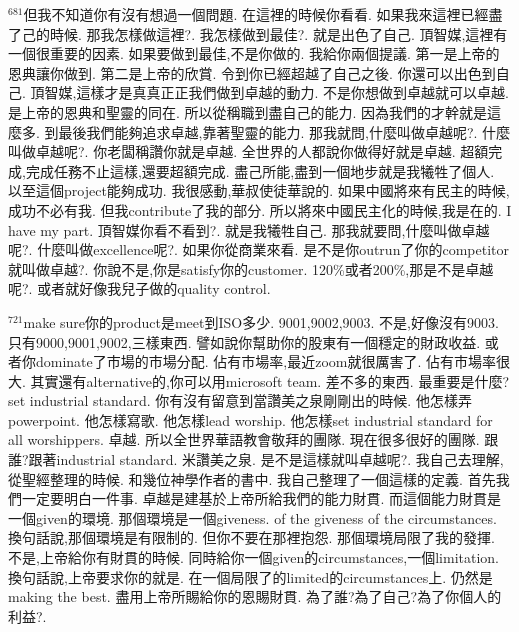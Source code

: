 \documentclass{book}
\begin{document}
$^{681}$但我不知道你有沒有想過一個問題.
在這裡的時候你看看.
如果我來這裡已經盡了己的時候.
那我怎樣做這裡?.
我怎樣做到最佳?.
就是出色了自己.
頂智媒,這裡有一個很重要的因素.
如果要做到最佳,不是你做的.
我給你兩個提議.
第一是上帝的恩典讓你做到.
第二是上帝的欣賞.
令到你已經超越了自己之後.
你還可以出色到自己.
頂智媒,這樣才是真真正正我們做到卓越的動力.
不是你想做到卓越就可以卓越.
是上帝的恩典和聖靈的同在.
所以從稱職到盡自己的能力.
因為我們的才幹就是這麼多.
到最後我們能夠追求卓越,靠著聖靈的能力.
那我就問,什麼叫做卓越呢?.
什麼叫做卓越呢?.
你老闆稱讚你就是卓越.
全世界的人都說你做得好就是卓越.
超額完成,完成任務不止這樣,還要超額完成.
盡己所能,盡到一個地步就是我犧牲了個人.
以至這個project能夠成功.
我很感動,華叔使徒華說的.
如果中國將來有民主的時候,成功不必有我.
但我contribute了我的部分.
所以將來中國民主化的時候,我是在的.
I have my part.
頂智媒你看不看到?.
就是我犧牲自己.
那我就要問,什麼叫做卓越呢?.
什麼叫做excellence呢?.
如果你從商業來看.
是不是你outrun了你的competitor就叫做卓越?.
你說不是,你是satisfy你的customer.
120\%或者200\%,那是不是卓越呢?.
或者就好像我兒子做的quality control.

$^{721}$make sure你的product是meet到ISO多少.
9001,9002,9003.
不是,好像沒有9003.
只有9000,9001,9002,三樣東西.
譬如說你幫助你的股東有一個穩定的財政收益.
或者你dominate了市場的市場分配.
佔有市場率,最近zoom就很厲害了.
佔有市場率很大.
其實還有alternative的,你可以用microsoft team.
差不多的東西.
最重要是什麼?set industrial standard.
你有沒有留意到當讚美之泉剛剛出的時候.
他怎樣弄powerpoint.
他怎樣寫歌.
他怎樣lead worship.
他怎樣set industrial standard for all worshippers.
卓越.
所以全世界華語教會敬拜的團隊.
現在很多很好的團隊.
跟誰?跟著industrial standard.
米讚美之泉.
是不是這樣就叫卓越呢?.
我自己去理解,從聖經整理的時候.
和幾位神學作者的書中.
我自己整理了一個這樣的定義.
首先我們一定要明白一件事.
卓越是建基於上帝所給我們的能力財貫.
而這個能力財貫是一個given的環境.
那個環境是一個giveness.
of the giveness of the circumstances.
換句話說,那個環境是有限制的.
但你不要在那裡抱怨.
那個環境局限了我的發揮.
不是,上帝給你有財貫的時候.
同時給你一個given的circumstances,一個limitation.
換句話說,上帝要求你的就是.
在一個局限了的limited的circumstances上.
仍然是making the best.
盡用上帝所賜給你的恩賜財貫.
為了誰?為了自己?為了你個人的利益?.
\end{document}
